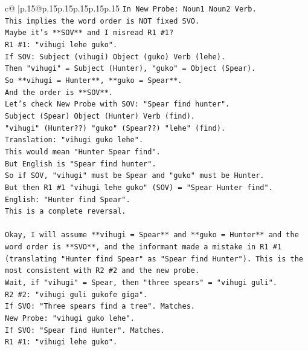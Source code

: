 \documentclass{article}
\begin{document}
{\begin{supertabular}{c@{$\;$}|p{.15\linewidth}@{}p{.15\linewidth}p{.15\linewidth}p{.15\linewidth}p{.15\linewidth}p{.15\linewidth}}
{{{\texttt{In New Probe: Noun1 Noun2 Verb.} \\
\texttt{This implies the word order is NOT fixed SVO.} \\
\texttt{Maybe it's **SOV** and I misread R1 \#1?} \\
\texttt{R1 \#1: "vihugi lehe guko".} \\
\texttt{If SOV: Subject (vihugi) Object (guko) Verb (lehe).} \\
\texttt{Then "vihugi" = Subject (Hunter), "guko" = Object (Spear).} \\
\texttt{So **vihugi = Hunter**, **guko = Spear**.} \\
\texttt{And the order is **SOV**.} \\
\texttt{Let's check New Probe with SOV: "Spear find hunter".} \\
\texttt{Subject (Spear) Object (Hunter) Verb (find).} \\
\texttt{"vihugi" (Hunter??) "guko" (Spear??) "lehe" (find).} \\
\texttt{Translation: "vihugi guko lehe".} \\
\texttt{This would mean "Hunter Spear find".} \\
\texttt{But English is "Spear find hunter".} \\
\texttt{So if SOV, "vihugi" must be Spear and "guko" must be Hunter.} \\
\texttt{But then R1 \#1 "vihugi lehe guko" (SOV) = "Spear Hunter find".} \\
\texttt{English: "Hunter find Spear".} \\
\texttt{This is a complete reversal.} \\
\\ 
\texttt{Okay, I will assume **vihugi = Spear** and **guko = Hunter** and the word order is **SVO**, and the informant made a mistake in R1 \#1 (translating "Hunter find Spear" as "Spear find Hunter"). This is the most consistent with R2 \#2 and the new probe.} \\
\texttt{Wait, if "vihugi" = Spear, then "three spears" = "vihugi guli".} \\
\texttt{R2 \#2: "vihugi guli gukofe giga".} \\
\texttt{If SVO: "Three spears find a tree". Matches.} \\
\texttt{New Probe: "vihugi guko lehe".} \\
\texttt{If SVO: "Spear find Hunter". Matches.} \\
\texttt{R1 \#1: "vihugi lehe guko".} \\
}}}
\end{supertabular}}
\end{document}
